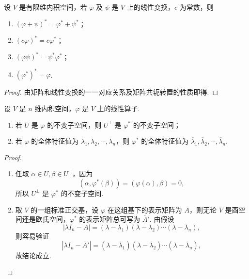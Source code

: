 \documentclass[../../main.tex]{subfiles}
\begin{document}
\begin{theorem}[伴随算子的性质]\label{theorem:伴随算子的性质}
设 $V$ 是有限维内积空间，若 $\varphi$ 及 $\psi$ 是 $V$ 上的线性变换，$c$ 为常数，则
\begin{enumerate}[(1)]
\item $(\varphi + \psi)^* = \varphi^* + \psi^*$；

\item $(c\varphi)^* = \overline{c}\varphi^*$；

\item $(\varphi\psi)^* = \psi^*\varphi^*$；

\item $(\varphi^*)^* = \varphi$.
\end{enumerate} 
\end{theorem}
\begin{proof}
由矩阵和线性变换的一一对应关系及矩阵共轭转置的性质即得.
\end{proof}

\begin{proposition}\label{proposition:线性算子的正交补空间就是伴随算子的不变子空间}
设 $V$ 是 $n$ 维内积空间，$\varphi$ 是 $V$ 上的线性算子.
\begin{enumerate}[(1)]
\item 若 $U$ 是 $\varphi$ 的不变子空间，则 $U^{\perp}$ 是 $\varphi^*$ 的不变子空间；

\item 若 $\varphi$ 的全体特征值为 $\lambda_1,\lambda_2,\cdots,\lambda_n$，则 $\varphi^*$ 的全体特征值为 $\overline{\lambda}_1,\overline{\lambda}_2,\cdots,\overline{\lambda}_n$.
\end{enumerate}
\end{proposition}
\begin{proof}
\begin{enumerate}[(1)]
\item 任取 $\alpha \in U, \beta \in U^{\perp}$，因为
\[
(\alpha,\varphi^*(\beta)) = (\varphi(\alpha),\beta) = 0,
\]
所以 $U^{\perp}$ 是 $\varphi^*$ 的不变子空间.

\item 取 $V$ 的一组标准正交基，设 $\varphi$ 在这组基下的表示矩阵为 $A$，则无论 $V$ 是酉空间还是欧氏空间，$\varphi^*$ 的表示矩阵总可写为 $\overline{A}'$. 由假设
\[
|\lambda I_n - A| = (\lambda - \lambda_1)(\lambda - \lambda_2)\cdots(\lambda - \lambda_n),
\]
则容易验证
\[
|\lambda I_n - \overline{A}'| = (\lambda - \overline{\lambda}_1)(\lambda - \overline{\lambda}_2)\cdots(\lambda - \overline{\lambda}_n),
\]
故结论成立.
\end{enumerate}
\end{proof}
\end{document}
